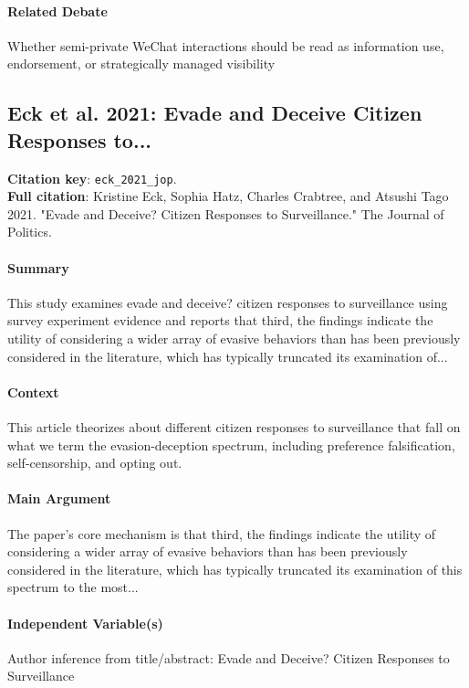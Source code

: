 \documentclass[12pt]{article}
\begin{document}
\paragraph{Related Debate} Whether semi-private WeChat interactions should be read as information use, endorsement, or strategically managed visibility


\subsection{Eck et al. 2021: Evade and Deceive Citizen Responses to...}
\textbf{Citation key}: \texttt{eck\_2021\_jop}.\\
\textbf{Full citation}: Kristine Eck, Sophia Hatz, Charles Crabtree, and Atsushi Tago 2021. "Evade and Deceive? Citizen Responses to Surveillance." The Journal of Politics.

\paragraph{Summary} This study examines evade and deceive? citizen responses to surveillance using survey experiment evidence and reports that third, the findings indicate the utility of considering a wider array of evasive behaviors than has been previously considered in the literature, which has typically truncated its examination of...

\paragraph{Context} This article theorizes about different citizen responses to surveillance that fall on what we term the evasion-deception spectrum, including preference falsification, self-censorship, and opting out.

\paragraph{Main Argument} The paper's core mechanism is that third, the findings indicate the utility of considering a wider array of evasive behaviors than has been previously considered in the literature, which has typically truncated its examination of this spectrum to the most...

\paragraph{Independent Variable(s)} Author inference from title/abstract: Evade and Deceive? Citizen Responses to Surveillance
\end{document}
